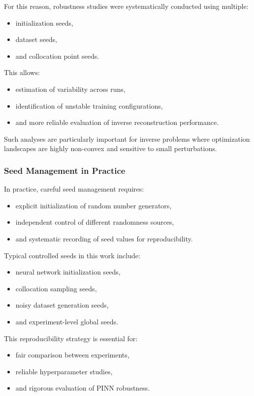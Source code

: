 For this reason, robustness studies were systematically conducted using multiple:
\begin{itemize}
    \item initialization seeds,
    \item dataset seeds,
    \item and collocation point seeds.
\end{itemize}

This allows:
\begin{itemize}
    \item estimation of variability across runs,
    \item identification of unstable training configurations,
    \item and more reliable evaluation of inverse reconstruction performance.
\end{itemize}

Such analyses are particularly important for inverse problems where optimization landscapes are highly non-convex and sensitive to small perturbations.

\subsubsection{Seed Management in Practice}

In practice, careful seed management requires:
\begin{itemize}
    \item explicit initialization of random number generators,
    \item independent control of different randomness sources,
    \item and systematic recording of seed values for reproducibility.
\end{itemize}

Typical controlled seeds in this work include:
\begin{itemize}
    \item neural network initialization seeds,
    \item collocation sampling seeds,
    \item noisy dataset generation seeds,
    \item and experiment-level global seeds.
\end{itemize}

This reproducibility strategy is essential for:
\begin{itemize}
    \item fair comparison between experiments,
    \item reliable hyperparameter studies,
    \item and rigorous evaluation of PINN robustness.
\end{itemize}

